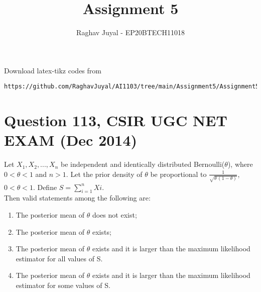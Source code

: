 \documentclass[journal,12pt,twocolumn]{IEEEtran}
\begin{document}
\let\vec\mathbf
\renewcommand{\thefigure}{\theproblem}
\def\putbox#1#2#3{\makebox[0in][l]{\makebox[#1][l]{}\raisebox{\baselineskip}[0in][0in]{\raisebox{#2}[0in][0in]{#3}}}}
     \def\rightbox#1{\makebox[0in][r]{#1}}
     \def\centbox#1{\makebox[0in]{#1}}
     \def\topbox#1{\raisebox{-\baselineskip}[0in][0in]{#1}}
     \def\midbox#1{\raisebox{-0.5\baselineskip}[0in][0in]{#1}}
\vspace{3cm}
\title{Assignment 5}
\author{Raghav Juyal - EP20BTECH11018}
\maketitle
\newpage
\bigskip
\renewcommand{\thefigure}{\theenumi}
\renewcommand{\thetable}{\theenumi}
Download latex-tikz codes from 
%
\begin{lstlisting}
https://github.com/RaghavJuyal/AI1103/tree/main/Assignment5/Assignment5.tex
\end{lstlisting}
\section*{Question 113, CSIR UGC NET EXAM (Dec 2014)}
Let $X_1,X_2,...,X_n$ be independent and identically distributed Bernoulli($\theta$), where $0<\theta<1$ and $n>1$. Let the prior density of $\theta$ be proportional to $\frac{1}{\sqrt{\theta\,(1-\theta)}}$, $0<\theta<1$. Define $S=\sum_{i=1}^nXi$.\\[1pt] Then valid statements among the following are:
\begin{enumerate}[label = \arabic*.]
    \item The posterior mean of $\theta$ does not exist;
    \item The posterior mean of $\theta$ exists;
    \item The posterior mean of $\theta$ exists and it is larger than the maximum likelihood estimator for all values of S.
    \item The posterior mean of $\theta$ exists and it is larger than the maximum likelihood estimator for some values of S.
\end{enumerate}
\end{document}

